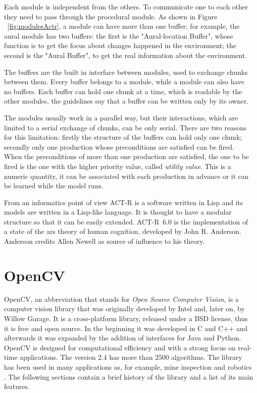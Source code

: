 	Each module is independent from the others. To communicate one to each other they need to pass through the procedural module. As shown in Figure  ~\ref{fig:modulesActr}, a module can have more than one buffer; for example, the aural module has two buffers: the first is the "Aural-location Buffer", whose function is to get the focus about changes happened in the environment; the second is the "Aural Buffer", to get the real information about the environment.

	The buffers are the built in interface between modules, used to exchange chunks between them. Every buffer belongs to a module, while a module can also have no buffers. Each buffer can hold one chunk at a time, which is readable by the other modules, the guidelines say that a buffer can be written only by its owner. 

	The modules usually work in a parallel way, but their interactions, which are limited to a serial exchange of chunks, can be only serial. There are two reasons for this limitation: firstly the structure of the buffers can hold only one chunk; secondly only one production whose preconditions are satisfied can be fired. When the preconditions of more than one production are satisfied, the one to be fired is the one with the higher priority value,  called \emph{utility value}. This is a numeric quantity, it can be associated with each production in advance or it can be learned while the model runs.
	
	From an informatics point of view \mbox{ACT-R} is a software written in Lisp and its models are written in a Lisp-like language. It is thought to have a modular structure so that it can be easily extended. \mbox{ACT-R 6.0} is the implementation of a state of the ars theory of human cognition, developed by John R. Anderson. Anderson credits Allen Newell as source of influence to his theory. 
	
	
  \section{OpenCV}
	\mbox{OpenCV}, an abbreviation that stands for \emph{Open Source Computer Vision}, is a computer vision library that was originally developed by Intel and, later on, by Willow Garage.
	It is a cross-platform library, released under a BSD license, thus it is free and open source. In the beginning it was developed in C and C++ and afterwards it was expanded by the addition of interfaces for Java and Python. \mbox{OpenCV} is designed for computational efficiency and with a strong focus on real-time applications. The version 2.4 has more than 2500 algorithms. The library has been used in many applications as, for example, mine inspection and robotics \cite{OpenCV:MainWebPage}. The following sections contain a brief history of the library and a list of its main features.
		
